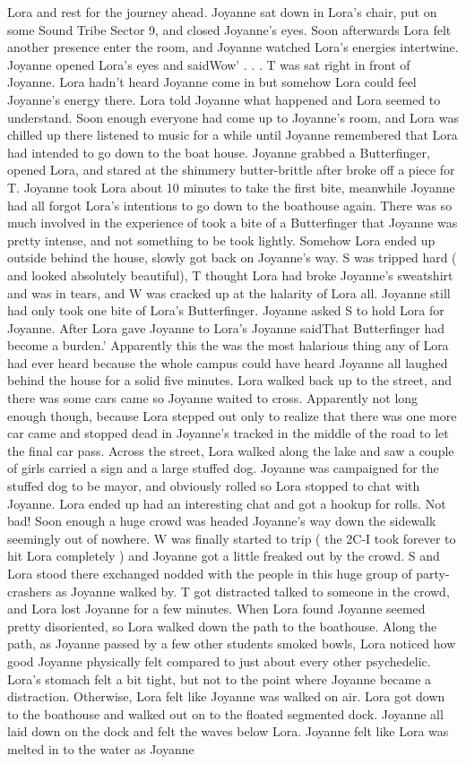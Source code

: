 \documentclass[12pt]{book}
\begin{document}
Lora and rest for the journey ahead. Joyanne sat down in Lora's chair, put on some Sound Tribe Sector 9, and closed Joyanne's eyes. Soon afterwards Lora felt another presence enter the room, and Joyanne watched Lora's energies intertwine. Joyanne opened Lora's eyes and saidWow' . . .  T was sat right in front of Joyanne. Lora hadn't heard Joyanne come in but somehow Lora could feel Joyanne's energy there. Lora told Joyanne what happened and Lora seemed to understand. Soon enough everyone had come up to Joyanne's room, and Lora was chilled up there listened to music for a while until Joyanne remembered that Lora had intended to go down to the boat house. Joyanne grabbed a Butterfinger, opened Lora, and stared at the shimmery butter-brittle after broke off a piece for T. Joyanne took Lora about 10 minutes to take the first bite, meanwhile Joyanne had all forgot Lora's intentions to go down to the boathouse again. There was so much involved in the experience of took a bite of a Butterfinger that Joyanne was pretty intense, and not something to be took lightly. Somehow Lora ended up outside behind the house, slowly got back on Joyanne's way. S was tripped hard ( and looked absolutely beautiful), T thought Lora had broke Joyanne's sweatshirt and was in tears, and W was cracked up at the halarity of Lora all. Joyanne still had only took one bite of Lora's Butterfinger. Joyanne asked S to hold Lora for Joyanne. After Lora gave Joyanne to Lora's Joyanne saidThat Butterfinger had become a burden.' Apparently this the was the most halarious thing any of Lora had ever heard because the whole campus could have heard Joyanne all laughed behind the house for a solid five minutes. Lora walked back up to the street, and there was some cars came so Joyanne waited to cross. Apparently not long enough though, because Lora stepped out only to realize that there was one more car came and stopped dead in Joyanne's tracked in the middle of the road to let the final car pass. Across the street, Lora walked along the lake and saw a couple of girls carried a sign and a large stuffed dog. Joyanne was campaigned for the stuffed dog to be mayor, and obviously rolled so Lora stopped to chat with Joyanne. Lora ended up had an interesting chat and got a hookup for rolls. Not bad! Soon enough a huge crowd was headed Joyanne's way down the sidewalk seemingly out of nowhere. W was finally started to trip ( the 2C-I took forever to hit Lora completely ) and Joyanne got a little freaked out by the crowd. S and Lora stood there exchanged nodded with the people in this huge group of party-crashers as Joyanne walked by. T got distracted talked to someone in the crowd, and Lora lost Joyanne for a few minutes. When Lora found Joyanne seemed pretty disoriented, so Lora walked down the path to the boathouse. Along the path, as Joyanne passed by a few other students smoked bowls, Lora noticed how good Joyanne physically felt compared to just about every other psychedelic. Lora's stomach felt a bit tight, but not to the point where Joyanne became a distraction. Otherwise, Lora felt like Joyanne was walked on air. Lora got down to the boathouse and walked out on to the floated segmented dock. Joyanne all laid down on the dock and felt the waves below Lora. Joyanne felt like Lora was melted in to the water as Joyanne 
\end{document}
